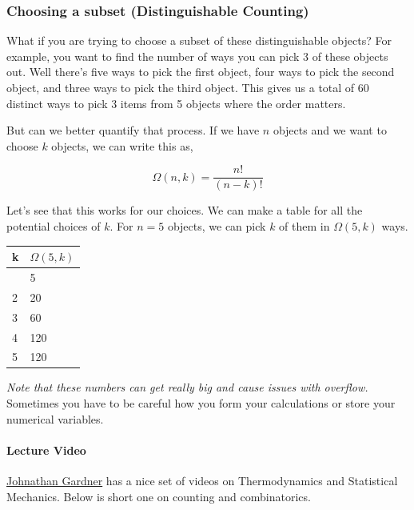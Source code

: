 \subsubsection{Choosing a subset (Distinguishable
Counting)}\label{choosing-a-subset-distinguishable-counting}

What if you are trying to choose a subset of these distinguishable
objects? For example, you want to find the number of ways you can pick 3
of these objects out. Well there's five ways to pick the first object,
four ways to pick the second object, and three ways to pick the third
object. This gives us a total of 60 distinct ways to pick 3 items from 5
objects where the order matters.

But can we better quantify that process. If we have \(n\) objects and we
want to choose \(k\) objects, we can write this as,

\[\Omega(n,k) = \frac{n!}{(n-k)!}\]

Let's see that this works for our choices. We can make a table for all
the potential choices of \(k\). For \(n=5\) objects, we can pick \(k\)
of them in \(\Omega(5,k)\) ways.

\begin{longtable}[]{@{}ll@{}}
\toprule\noalign{}
k & \(\Omega(5,k)\) \\
\midrule\noalign{}
\endhead
\bottomrule\noalign{}
\endlastfoot
1 & 5 \\
2 & 20 \\
3 & 60 \\
4 & 120 \\
5 & 120 \\
\end{longtable}

\emph{Note that these numbers can get really big and cause issues with
overflow.} Sometimes you have to be careful how you form your
calculations or store your numerical variables.

\paragraph{Lecture Video}\label{lecture-video}

\href{https://inv.tux.pizza/channel/UC5KbWmC93TBhinPLqh5j2kg}{Johnathan
Gardner} has a nice set of videos on Thermodynamics and Statistical
Mechanics. Below is short one on counting and combinatorics.

\href{https://inv.tux.pizza/watch?v=tEQFftB1Pao}{\pandocbounded{\texttt{[image: https://markdown-videos-api.jorgenkh.no/youtube/tEQFftB1Pao?width=720\&height=405]}}}

